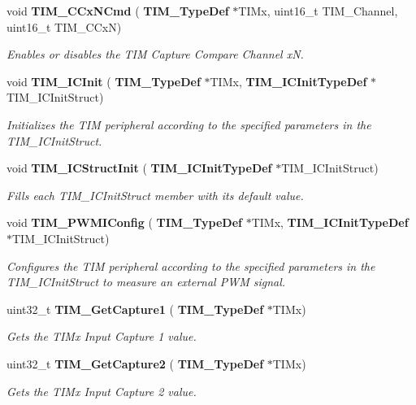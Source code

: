 \begin{DoxyCompactItemize}
void \textbf{ T\+I\+M\+\_\+\+C\+Cx\+N\+Cmd} (\textbf{ T\+I\+M\+\_\+\+Type\+Def} $\ast$T\+I\+Mx, uint16\+\_\+t T\+I\+M\+\_\+\+Channel, uint16\+\_\+t T\+I\+M\+\_\+\+C\+CxN)
\begin{DoxyCompactList}\small\item\em Enables or disables the T\+IM Capture Compare Channel xN. \end{DoxyCompactList}\item 
void \textbf{ T\+I\+M\+\_\+\+I\+C\+Init} (\textbf{ T\+I\+M\+\_\+\+Type\+Def} $\ast$T\+I\+Mx, \textbf{ T\+I\+M\+\_\+\+I\+C\+Init\+Type\+Def} $\ast$T\+I\+M\+\_\+\+I\+C\+Init\+Struct)
\begin{DoxyCompactList}\small\item\em Initializes the T\+IM peripheral according to the specified parameters in the T\+I\+M\+\_\+\+I\+C\+Init\+Struct. \end{DoxyCompactList}\item 
void \textbf{ T\+I\+M\+\_\+\+I\+C\+Struct\+Init} (\textbf{ T\+I\+M\+\_\+\+I\+C\+Init\+Type\+Def} $\ast$T\+I\+M\+\_\+\+I\+C\+Init\+Struct)
\begin{DoxyCompactList}\small\item\em Fills each T\+I\+M\+\_\+\+I\+C\+Init\+Struct member with its default value. \end{DoxyCompactList}\item 
void \textbf{ T\+I\+M\+\_\+\+P\+W\+M\+I\+Config} (\textbf{ T\+I\+M\+\_\+\+Type\+Def} $\ast$T\+I\+Mx, \textbf{ T\+I\+M\+\_\+\+I\+C\+Init\+Type\+Def} $\ast$T\+I\+M\+\_\+\+I\+C\+Init\+Struct)
\begin{DoxyCompactList}\small\item\em Configures the T\+IM peripheral according to the specified parameters in the T\+I\+M\+\_\+\+I\+C\+Init\+Struct to measure an external P\+WM signal. \end{DoxyCompactList}\item 
uint32\+\_\+t \textbf{ T\+I\+M\+\_\+\+Get\+Capture1} (\textbf{ T\+I\+M\+\_\+\+Type\+Def} $\ast$T\+I\+Mx)
\begin{DoxyCompactList}\small\item\em Gets the T\+I\+Mx Input Capture 1 value. \end{DoxyCompactList}\item 
uint32\+\_\+t \textbf{ T\+I\+M\+\_\+\+Get\+Capture2} (\textbf{ T\+I\+M\+\_\+\+Type\+Def} $\ast$T\+I\+Mx)
\begin{DoxyCompactList}\small\item\em Gets the T\+I\+Mx Input Capture 2 value. \end{DoxyCompactList}\item 

\end{DoxyCompactItemize}
